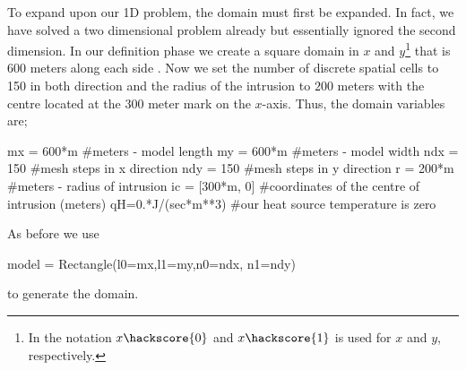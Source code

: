 To expand upon our 1D problem, the domain must first be expanded. In fact, we have solved a two dimensional problem already but essentially ignored the second dimension. In our definition phase we create a square domain in $x$ and $y$\footnote{In \esc the notation
$x\hackscore{0}$ and $x\hackscore{1}$ is used for $x$ and $y$, respectively.} that is $600$ meters along each side . Now we set the number of discrete spatial cells to 150 in both direction and the radius of the intrusion to $200$ meters with the centre located at the $300$ meter mark on the $x$-axis. Thus, the domain variables are;
\begin{python}
mx = 600*m #meters - model length
my = 600*m #meters - model width
ndx = 150 #mesh steps in x direction 
ndy = 150 #mesh steps in y direction
r = 200*m #meters - radius of intrusion
ic = [300*m, 0] #coordinates of the centre of intrusion (meters)
qH=0.*J/(sec*m**3) #our heat source temperature is zero
\end{python}
As before we use 
\begin{python}
model = Rectangle(l0=mx,l1=my,n0=ndx, n1=ndy)
\end{python}
to generate the domain. 

